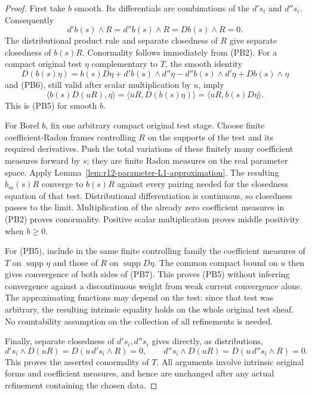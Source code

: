 \begin{proof}
First take $b$ smooth. Its differentials are combinations of the
$d's_i$ and $d''s_i$. Consequently
\[
 d'b(s)\wedge R=d''b(s)\wedge R=Db(s)\wedge R=0.
 \tag{PB6}
\]
The distributional product rule and separate closedness of $R$
give separate closedness of $b(s)R$. Conormality follows immediately
from (PB2). For a compact original test $\eta$ complementary to $T$,
the smooth identity
\[
 D(b(s)\eta)=b(s)D\eta+d'b(s)\wedge d''\eta
                    -d''b(s)\wedge d'\eta+Db(s)\wedge\eta
\]
and (PB6), still valid after scalar multiplication by $u$, imply
\[
 \langle b(s)D(uR),\eta\rangle
   =\langle uR,D(b(s)\eta)\rangle
   =\langle uR,b(s)D\eta\rangle.
 \tag{PB7}
\]
This is (PB5) for smooth $b$.

For Borel $b$, fix one arbitrary compact original test stage. Choose
finite coefficient-Radon frames controlling $R$ on the supports of
the test and its required derivatives. Push the total variations of
these finitely many coefficient measures forward by $s$; they are
finite Radon measures on the real parameter space. Apply
Lemma~\ref{lem:r12-parameter-L1-approximation}. The resulting
$b_m(s)R$ converge to $b(s)R$ against every pairing needed for the
closedness equation of that test. Distributional differentiation is
continuous, so closedness passes to the limit. Multiplication of the
already zero coefficient measures in (PB2) proves conormality.
Positive scalar multiplication proves middle positivity when $b\ge0$.

For (PB5), include in the same finite controlling family the
coefficient measures of $T$ on $\operatorname{supp}\eta$ and those
of $R$ on $\operatorname{supp}D\eta$. The common compact bound on
$u$ then gives convergence of both sides of (PB7). This proves
(PB5) without inferring convergence against a discontinuous weight
from weak current convergence alone. The approximating functions
may depend on the test: since that test was arbitrary, the resulting
intrinsic equality holds on the whole original test sheaf. No
countability assumption on the collection of all refinements is
needed.

Finally, separate closedness of $d's_i,d''s_i$ gives directly, as
distributions,
\[
 d's_i\wedge D(uR)=D(u\,d's_i\wedge R)=0,
 \qquad
 d''s_i\wedge D(uR)=D(u\,d''s_i\wedge R)=0.
 \tag{PB8}
\]
This proves the asserted conormality of $T$. All arguments involve
intrinsic original forms and coefficient measures, and hence are
unchanged after any actual refinement containing the chosen data.
\end{proof}

